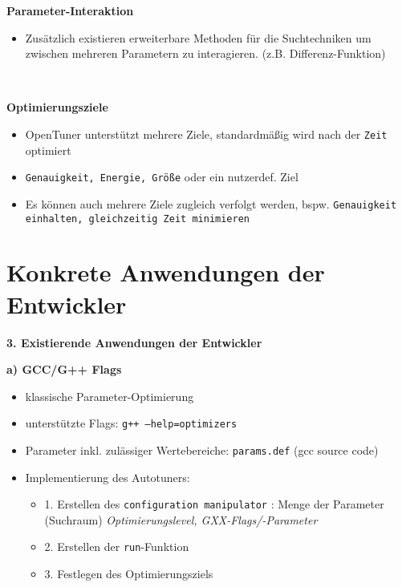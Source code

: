   \begin{frame}
  \textbf{Parameter-Interaktion}
    \begin{itemize}
      \item Zusätzlich existieren erweiterbare Methoden für die Suchtechniken um zwischen mehreren Parametern 
    zu interagieren. (z.B. Differenz-Funktion)
    \end{itemize}
    
    \textbf{\\}
  
  \textbf{Optimierungsziele}
    \begin{itemize}
      \item OpenTuner unterstützt mehrere Ziele, standardmäßig wird nach der \texttt{Zeit} optimiert
      \item \texttt{Genauigkeit, Energie, Größe} oder ein nutzerdef. Ziel
      \item Es können auch mehrere Ziele zugleich verfolgt werden, bspw. \texttt{Genauigkeit einhalten, gleichzeitig
      Zeit minimieren}
    \end{itemize}
  \end{frame}
    
    \section{Konkrete Anwendungen der Entwickler}
    
    \begin{frame}
    \textbf{3. Existierende Anwendungen der Entwickler} \newline
      
    \textbf{a) GCC/G++ Flags}
      \begin{itemize}
        \item klassische Parameter-Optimierung
        \item unterstützte Flags: \texttt{g++ --help=optimizers}
        \item Parameter inkl. zulässiger Wertebereiche: \texttt{params.def} (gcc source code)
        \item Implementierung des Autotuners:
        \begin{itemize}
          \item 1. Erstellen des \texttt{configuration manipulator} : Menge der Parameter (Suchraum) \newline
          \emph{Optimierungslevel, GXX-Flags/-Parameter}
          \item 2. Erstellen der \texttt{run}-Funktion
          \item 3. Festlegen des Optimierungsziels
        \end{itemize}
      \end{itemize}
    \end{frame}
        
